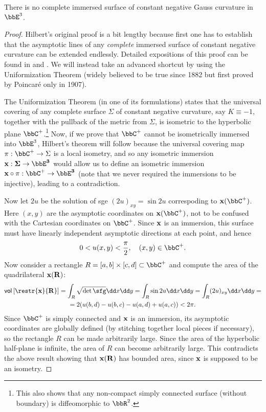 \begin{thm}[Hilbert (1901)]
    There is no complete immersed surface of constant negative Gauss curvature in $\bbE^3$.
\end{thm}
\begin{proof}
    Hilbert's original proof is a bit lengthy because first one has to establish that the asymptotic lines of any \emph{complete} immersed surface of constant negative curvature can be extended endlessly. Detailed expositions of this proof can be found in \cite[\S5-11]{doCarmo} and \cite[p.~251]{Spivak3}.  We will instead take an advanced shortcut by using the Uniformization Theorem (widely believed to be true since 1882 but first proved by Poincar\'e only in 1907).

    The Uniformization Theorem (in one of its formulations) states that the universal covering of any complete surface $\Sigma$ of constant negative curvature, say $K\equiv -1$, together with the pullback of the metric from $\Sigma$, is isometric to the hyperbolic plane $\bbC^+$.\footnote{This also shows that any non-compact simply connected surface (without boundary) is diffeomorphic to $\bbR^2$.} Now, if we prove that $\bbC^+$ cannot be isometrically immersed into $\bbE^3$, Hilbert's theorem will follow because the universal covering map $\pi:\bbC^+\to \Sigma$ is a local isometry, and so any isometric immersion  $\bf{x}:\Sigma\to \bbE^3$ would allow us to define an isometric immersion $\bf{x}\circ \pi:\bbC^+\to \bbE^3$ (note that we never required the immersions to be injective), leading to a contradiction.

    Now let $2u$ be the solution of \gls{sge} $(2u)_{xy}=\sin 2u$ correspoding to $\bf{x}(\bbC^+)$. Here $(x,y)$ are the asymptotic coordinates on $\bf{x}(\bbC^+)$, not to be confused with the Cartesian coordinates on $\bbC^+$. Since $\bf{x}$ is an immersion, this surface must have linearly independent asymptotic directions at each point, and hence 
    \[0<u(x,y)<\frac{\pi}{2},\quad (x,y)\in \bbC^+.\]
    Now consider a rectangle $R=[a,b]\times [c,d]\subset\bbC^+$ and compute the area of the quadrilateral $\bf{x}(R)$:
    \begin{multline}
        \mathsf{vol}\left[\restr{\bf{x}}{R}\right]=\int_R \sqrt{\det \sfg}\dd x\dd y=\int_R \sin 2 u\dd x\dd y=\int_R (2u)_{xy}\dd x\dd y=\\
        =2(u(b,d)-u(b,c)-u(a,d)+u(a,c))<2\pi.
    \end{multline}
    Since $\bbC^+$ is simply connected and $\bf{x}$ is an immersion, its asymptotic coordinates are globally defined (by stitching together local pieces if necessary), so the rectangle $R$ can be made arbitrarily large. Since the area of the hyperbolic half-plane is infinite, the area of $R$ can become arbitrarily large. This contradicts the above result showing that $\bf{x}(R)$ has bounded area, since $\bf{x}$ is supposed to be an isometry.
\end{proof}


